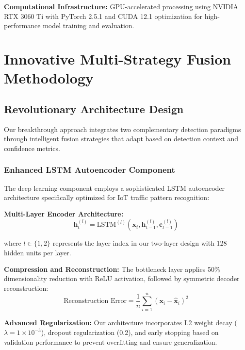 \documentclass[conference]{IEEEtran}
\begin{document}
\textbf{Computational Infrastructure:}
GPU-accelerated processing using NVIDIA RTX 3060 Ti with PyTorch 2.5.1 and CUDA 12.1 optimization for high-performance model training and evaluation.

\section{Innovative Multi-Strategy Fusion Methodology}

\subsection{Revolutionary Architecture Design}

Our breakthrough approach integrates two complementary detection paradigms through intelligent fusion strategies that adapt based on detection context and confidence metrics.

\subsubsection{Enhanced LSTM Autoencoder Component}

The deep learning component employs a sophisticated LSTM autoencoder architecture specifically optimized for IoT traffic pattern recognition:

\textbf{Multi-Layer Encoder Architecture:}
\begin{equation}
\mathbf{h}_t^{(l)} = \text{LSTM}^{(l)}(\mathbf{x}_t, \mathbf{h}_{t-1}^{(l)}, \mathbf{c}_{t-1}^{(l)})
\end{equation}

where $l \in \{1,2\}$ represents the layer index in our two-layer design with 128 hidden units per layer.

\textbf{Compression and Reconstruction:}
The bottleneck layer applies 50\% dimensionality reduction with ReLU activation, followed by symmetric decoder reconstruction:
\begin{equation}
\text{Reconstruction Error} = \frac{1}{n} \sum_{i=1}^{n} (\mathbf{x}_i - \hat{\mathbf{x}}_i)^2
\end{equation}

\textbf{Advanced Regularization:}
Our architecture incorporates L2 weight decay ($\lambda = 1 \times 10^{-5}$), dropout regularization (0.2), and early stopping based on validation performance to prevent overfitting and ensure generalization.
\end{document}
